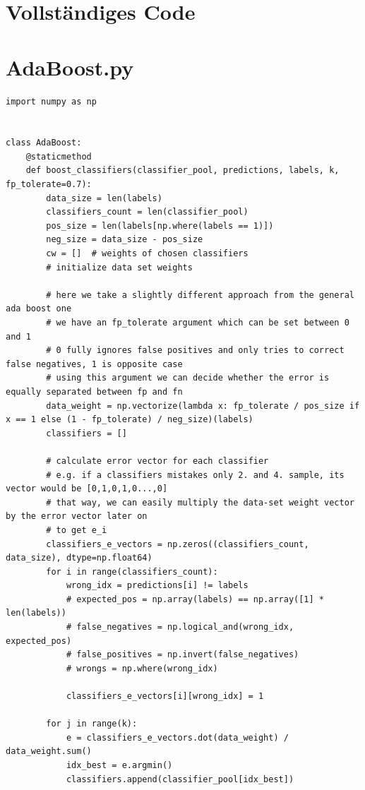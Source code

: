\section*{Vollständiges Code}

\section*{AdaBoost.py}

\begin{lstlisting}[style=py]
import numpy as np


class AdaBoost:
    @staticmethod
    def boost_classifiers(classifier_pool, predictions, labels, k, fp_tolerate=0.7):
        data_size = len(labels)
        classifiers_count = len(classifier_pool)
        pos_size = len(labels[np.where(labels == 1)])
        neg_size = data_size - pos_size
        cw = []  # weights of chosen classifiers
        # initialize data set weights

        # here we take a slightly different approach from the general ada boost one
        # we have an fp_tolerate argument which can be set between 0 and 1
        # 0 fully ignores false positives and only tries to correct false negatives, 1 is opposite case
        # using this argument we can decide whether the error is equally separated between fp and fn
        data_weight = np.vectorize(lambda x: fp_tolerate / pos_size if x == 1 else (1 - fp_tolerate) / neg_size)(labels)
        classifiers = []

        # calculate error vector for each classifier
        # e.g. if a classifiers mistakes only 2. and 4. sample, its vector would be [0,1,0,1,0...,0]
        # that way, we can easily multiply the data-set weight vector by the error vector later on
        # to get e_i
        classifiers_e_vectors = np.zeros((classifiers_count, data_size), dtype=np.float64)
        for i in range(classifiers_count):
            wrong_idx = predictions[i] != labels
            # expected_pos = np.array(labels) == np.array([1] * len(labels))
            # false_negatives = np.logical_and(wrong_idx, expected_pos)
            # false_positives = np.invert(false_negatives)
            # wrongs = np.where(wrong_idx)

            classifiers_e_vectors[i][wrong_idx] = 1

        for j in range(k):
            e = classifiers_e_vectors.dot(data_weight) / data_weight.sum()
            idx_best = e.argmin()
            classifiers.append(classifier_pool[idx_best])


\end{lstlisting}
